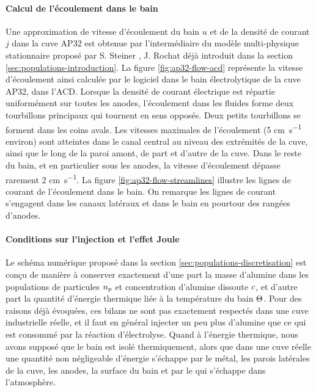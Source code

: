 \paragraph{Calcul de l'écoulement dans le bain} Une approximation de vitesse
d'écoulement du bain $u$ et de la densité de courant $j$ dans la cuve
AP32 est obtenue par l'intermédiaire du modèle multi-physique
stationnaire proposé par S. Steiner \cite{Steiner2009}, J. Rochat
\cite{Rochat2016} déjà introduit dans la section
\ref{sec:populations-introduction}. La figure \ref{fig:ap32-flow-acd}
représente la vitesse d'écoulement ainsi calculée par le logiciel
\citealucell{} dans le bain électrolytique de la cuve AP32, dans
l'ACD. Lorsque la densité de courant électrique est répartie
uniformément sur toutes les anodes, l'écoulement dans les fluides
forme deux tourbillons principaux qui tournent en sens opposés. Deux
petits tourbillons se forment dans les coins avals. Les vitesses
maximales de l'écoulement (\num{5} \si{\centi\meter\per\second}
environ) sont atteintes dans le canal central au niveau des extrémités
de la cuve, ainsi que le long de la paroi amont, de part et d'autre de
la cuve. Dans le reste du bain, et en particulier sous les anodes, la
vitesse d'écoulement dépasse rarement \num{2}
\si{\centi\meter\per\second}. La figure
\ref{fig:ap32-flow-streamlines} illustre les lignes de courant de
l'écoulement dans le bain. On remarque les lignes de courant
s'engagent dans les canaux latéraux et dans le bain en
pourtour des rangées d'anodes.

\paragraph{Conditions sur l'injection et l'effet Joule}
Le schéma numérique proposé dans la section
\ref{sec:populations-discretisation} est conçu de manière à conserver
exactement d'une part la masse d'alumine dans les populations de
particules $n_p$ et concentration d'alumine dissoute
$c$, et d'autre part la quantité d'énergie thermique liée
à la température du bain $\Theta$. Pour des raisons déjà
évoquées, ces bilans ne sont pas exactement respectés dans une cuve
industrielle réelle, et il faut en général injecter un peu plus d'alumine
que ce qui est consommé par la réaction d'électrolyse. Quand à
l'énergie thermique, nous avons supposé que le bain est isolé
thermiquement, alors que dans une cuve réelle une quantité non
négligeable d'énergie s'échappe par le métal, les parois latérales de
la cuve, les anodes, la surface du bain et par le  qui
s'échappe dans l'atmosphère.

